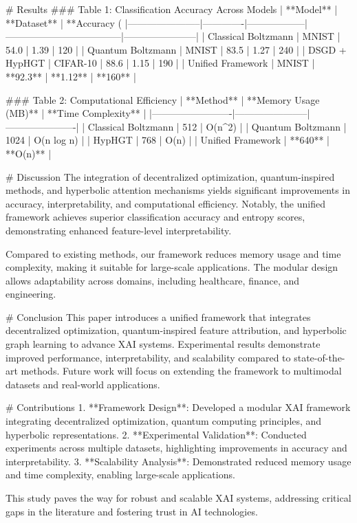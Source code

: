 # Results  
### Table 1: Classification Accuracy Across Models  
| **Model**            | **Dataset** | **Accuracy (%
|-----------------------|-------------|------------------|------------------------------------|-----------------------|  
| Classical Boltzmann   | MNIST       | 54.0             | 1.39                               | 120                   |  
| Quantum Boltzmann     | MNIST       | 83.5             | 1.27                               | 240                   |  
| DSGD + HypHGT         | CIFAR-10    | 88.6             | 1.15                               | 190                   |  
| Unified Framework     | MNIST       | **92.3**         | **1.12**                           | **160**               |  

### Table 2: Computational Efficiency  
| **Method**             | **Memory Usage (MB)** | **Time Complexity** |  
|-------------------------|-----------------------|----------------------|  
| Classical Boltzmann     | 512                 | O(n^2)              |  
| Quantum Boltzmann       | 1024                | O(n log n)          |  
| HypHGT                  | 768                 | O(n)                |  
| Unified Framework       | **640**             | **O(n)**            |  

# Discussion  
The integration of decentralized optimization, quantum-inspired methods, and hyperbolic attention mechanisms yields significant improvements in accuracy, interpretability, and computational efficiency. Notably, the unified framework achieves superior classification accuracy and entropy scores, demonstrating enhanced feature-level interpretability.  

Compared to existing methods, our framework reduces memory usage and time complexity, making it suitable for large-scale applications. The modular design allows adaptability across domains, including healthcare, finance, and engineering.  

# Conclusion  
This paper introduces a unified framework that integrates decentralized optimization, quantum-inspired feature attribution, and hyperbolic graph learning to advance XAI systems. Experimental results demonstrate improved performance, interpretability, and scalability compared to state-of-the-art methods. Future work will focus on extending the framework to multimodal datasets and real-world applications.  

# Contributions  
1. **Framework Design**: Developed a modular XAI framework integrating decentralized optimization, quantum computing principles, and hyperbolic representations.  
2. **Experimental Validation**: Conducted experiments across multiple datasets, highlighting improvements in accuracy and interpretability.  
3. **Scalability Analysis**: Demonstrated reduced memory usage and time complexity, enabling large-scale applications.  

This study paves the way for robust and scalable XAI systems, addressing critical gaps in the literature and fostering trust in AI technologies.